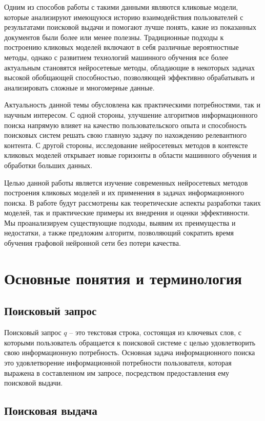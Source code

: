 \documentclass[diploma]{nanolab2015}
\begin{document}
Одним из способов работы с такими данными являются кликовые модели, которые анализируют имеющуюся историю взаимодействия пользователей с результатами поисковой выдачи и помогают лучше понять, какие из показанных документов были более или менее полезны. Традиционные подходы к построению кликовых моделей включают в себя различные вероятностные методы, однако с развитием технологий машинного обучения все более актуальным становятся нейросетевые методы, обладающие в некоторых задачах высокой обобщающей способностью, позволяющей эффективно обрабатывать и анализировать сложные и многомерные данные.

Актуальность данной темы обусловлена как практическими потребностями, так и научным интересом. С одной стороны, улучшение алгоритмов информационного поиска напрямую влияет на качество пользовательского опыта и способность поисковых систем решать свою главную задачу по нахождению релевантного контента. С другой стороны, исследование нейросетевых методов в контексте кликовых моделей открывает новые горизонты в области машинного обучения и обработки больших данных.

Целью данной работы является изучение современных нейросетевых методов построения кликовых моделей и их применения в задачах информационного поиска. В работе будут рассмотрены как теоретические аспекты разработки таких моделей, так и практические примеры их внедрения и оценки эффективности. Мы проанализируем существующие подходы, выявим их преимущества и недостатки, а также предложим алгоритм, позволяющий сократить время обучения графовой нейронной сети без потери качества.
\newpage
\section{Основные понятия и терминология}
\subsection{Поисковый запрос}
Поисковый запрос $q$ -- это текстовая строка, состоящая из ключевых слов, с которыми пользователь обращается к поисковой системе с целью удовлетворить свою информационную потребность. Основная задача информационного поиска это удовлетворение информационной потребности пользователя, которая выражена в составленном им запросе, посредством предоставления ему поисковой выдачи.

\subsection{Поисковая выдача}
\end{document}
